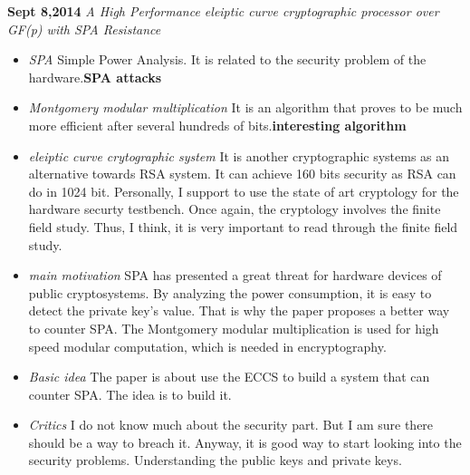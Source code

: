 \documentclass[]{article}
\begin{document}
\noindent \textbf{Sept 8,2014}
\textit{A High Performance eleiptic curve cryptographic processor over GF(p) with SPA Resistance}
\indent		\begin{itemize}

            \item \textit{SPA} Simple Power Analysis. It is related to the security problem of the hardware.\textbf{SPA attacks}

            \item \textit{Montgomery modular multiplication} It is an algorithm that proves to be much more efficient after several hundreds of bits.\textbf{interesting algorithm}
            
            \item \textit{eleiptic curve crytographic system} It is another cryptographic systems as an alternative towards RSA system. It can achieve 160 bits security as RSA can do
                in 1024 bit. Personally, I support to use the state of art cryptology for the hardware securty testbench. Once again, the cryptology involves the finite field study.
                Thus, I think, it is very important to read through the finite field study.

            \item \textit{main motivation} SPA has presented a great threat for hardware devices of public cryptosystems. By analyzing the power consumption, it is easy to detect
                the private key's value. That is why the paper proposes a better way to counter SPA. The Montgomery modular multiplication is used for high speed modular computation, which
                is needed in encryptography.

            \item \textit{Basic idea} The paper is about use the ECCS to build a system that can counter SPA. The idea is to build it.

            \item \textit{Critics} I do not know much about the security part. But I am sure there should be a way to breach it. Anyway, it is good way to start looking into the security
                problems. Understanding the public keys and private keys.

            \end{itemize}
\end{document}
